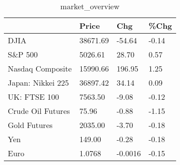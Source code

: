 \documentclass{article}%
\begin{document}
%


\begin{table}[htbp]%
\caption{market\_overview}%
\centering%
\begin{adjustbox}{width=1\textwidth}%
\begin{tabular}{llll}
\toprule
                  &    Price &     Chg &  \%Chg \\
\midrule
             DJIA & 38671.69 &  -54.64 & -0.14 \\
          S\&P 500 &  5026.61 &   28.70 &  0.57 \\
 Nasdaq Composite & 15990.66 &  196.95 &  1.25 \\
Japan: Nikkei 225 & 36897.42 &   34.14 &  0.09 \\
     UK: FTSE 100 &  7563.50 &   -9.08 & -0.12 \\
Crude Oil Futures &    75.96 &   -0.88 & -1.15 \\
     Gold Futures &  2035.00 &   -3.70 & -0.18 \\
              Yen &   149.00 &   -0.28 & -0.18 \\
             Euro &   1.0768 & -0.0016 & -0.15 \\
\bottomrule
\end{tabular}
%
\end{adjustbox}%
\end{table}

%
\end{document}
